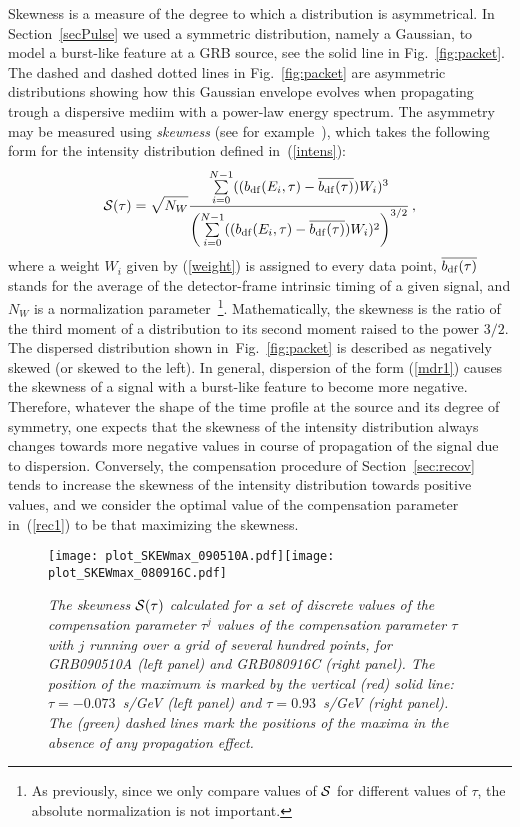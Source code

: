 \documentclass[12pt]{article}
\newcommand{\beq}{\begin{equation}}
\newcommand{\eeq}{\end{equation}}
\begin{document}
{Skewness is a measure of the degree to which a distribution is asymmetrical. In Section~\ref{secPulse}
we used a symmetric distribution, namely a Gaussian, to model a burst-like feature at a GRB source, see the
solid line in Fig.~\ref{fig:packet}. The dashed and dashed dotted lines in Fig.~\ref{fig:packet} are
asymmetric distributions showing how this Gaussian envelope evolves when propagating trough a dispersive
mediim with a power-law energy spectrum.
The asymmetry may be measured using {\it skewness}
(see for example~\cite{statBOOK1}), which takes the following form
for the intensity distribution defined in~(\ref{intens}):
\beq
\label{skew1}
{\cal S(\tau )}=\sqrt{N_W}
\frac{\sum\limits_{i=0}^{N-1}((b_{\rm df}(E_i,\tau )-\overline{b_{\rm df}(\tau )})W_i)^3}
{\left(\sum\limits_{i=0}^{N-1}((b_{\rm df}(E_i,\tau )-\overline{b_{\rm df}(\tau )})W_i)^2\right)^{3/2}} \, ,
\eeq
where a weight $W_i$ given by (\ref{weight}) is assigned to every data point,
$\overline{b_{\rm df}(\tau )}$ stands for the average of the detector-frame intrinsic timing
of a given signal, and $N_W$ is a normalization parameter~\footnote{As previously,
since we only compare values of ${\cal S}$
for different values of $\tau $, the absolute normalization is not important.}.
Mathematically, the skewness is the ratio of the third moment of a distribution to its second moment raised
to the power $3/2$. The dispersed distribution shown in~Fig.~\ref{fig:packet} is described as negatively
skewed (or skewed to the left).
In general, dispersion of the form (\ref{mdr1}) causes the skewness of a signal with a burst-like feature
to become more negative.
{Therefore, whatever the shape of the time profile at the source and its degree of symmetry,
one expects that the skewness of the intensity distribution always changes towards more negative values in
course of propagation of the signal due to dispersion.
Conversely, the compensation procedure of Section~\ref{sec:recov} tends
to increase the skewness of the intensity distribution towards positive values, and we consider
the optimal value of the compensation parameter in~(\ref{rec1}) to be that maximizing the skewness.}

\begin{figure}
\centering
\texttt{[image: plot\_SKEWmax\_090510A.pdf]}\hspace{0cm}\texttt{[image: plot\_SKEWmax\_080916C.pdf]}
\vspace{-0.4cm}
\caption{\it The skewness ${\cal S(\tau )}$ calculated for a set of discrete values of the compensation parameter $\tau ^j$
values of the compensation parameter $\tau $ with $j$ running over a grid of several hundred points, for
GRB090510A (left panel) and GRB080916C (right panel). The position of the maximum is
marked by the vertical (red) solid line: $\tau  =- 0.073$~s/GeV (left panel)
and $\tau  = 0.93$~s/GeV (right panel).
The (green) dashed lines mark the positions of the maxima in the absence of any propagation effect.}
\label{fig:SKEV}
\end{figure}

}
\end{document}
